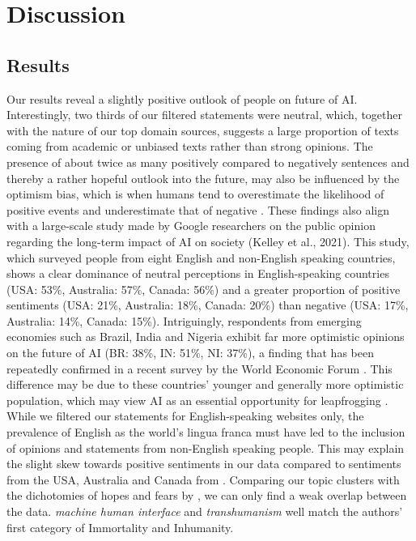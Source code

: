 \section{Discussion}

\subsection{Results}
Our results reveal a slightly positive outlook of people on future of AI.
Interestingly, two thirds of our filtered statements were neutral, which, together with the nature of our top domain sources, suggests a large proportion of texts coming from academic or unbiased texts rather than strong opinions.
The presence of about twice as many positively compared to negatively sentences and thereby a rather hopeful outlook into the future, may also be influenced by the optimism bias, which is when humans tend to overestimate the likelihood of positive events and underestimate that of negative \citep{sharot2011optimism}.
These findings also align with a large-scale study made by Google researchers on the public opinion regarding the long-term impact of AI on society (Kelley et al., 2021).
This study, which surveyed people from eight English and non-English speaking countries, shows a clear dominance of neutral perceptions in English-speaking countries (USA: 53\%, Australia: 57\%, Canada: 56\%) and a greater proportion of positive sentiments (USA: 21\%, Australia: 18\%, Canada: 20\%) than negative (USA: 17\%, Australia: 14\%, Canada: 15\%).
Intriguingly, respondents from emerging economies such as Brazil, India and Nigeria exhibit far more optimistic opinions on the future of AI (BR: 38\%, IN: 51\%, NI: 37\%), a finding that has been repeatedly confirmed in a recent survey by the World Economic Forum \citep{Markovitz2022}.
This difference may be due to these countries’ younger and generally more optimistic population, which may view AI as an essential opportunity for leapfrogging \citep{zhenmin2019frontier}.
While we filtered our statements for English-speaking websites only, the prevalence of English as the world’s lingua franca must have led to the inclusion of opinions and statements from non-English speaking people.
This may explain the slight skew towards positive sentiments in our data compared to sentiments from the USA, Australia and Canada from \citet{kelley2021exciting}.
Comparing our topic clusters with the dichotomies of hopes and fears by \citet{cave2019}, we can only find a weak overlap between the data.
\emph{machine human interface} and \emph{transhumanism} well match the authors’ first category of Immortality and Inhumanity.
